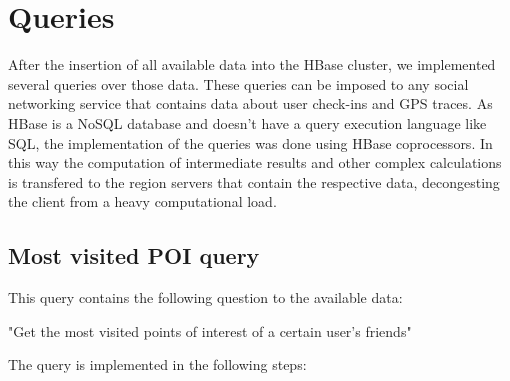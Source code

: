 \chapter{Queries}

After the insertion of all available data into the HBase cluster, we implemented several queries over those data. These queries can be imposed to any 
social networking service that contains data about user check-ins and GPS traces. As HBase is a NoSQL database and doesn't have a query execution language like SQL, 
the implementation of the queries was done using HBase coprocessors. In this way the computation of intermediate results and other complex calculations is 
transfered to the region servers that contain the respective data, decongesting the client from a heavy computational load.

\section{Most visited POI query}

This query contains the following question to the available data:
\begin{center}
 "Get the most visited points of interest of a certain user's friends"
\end{center}

The query is implemented in the following steps:

